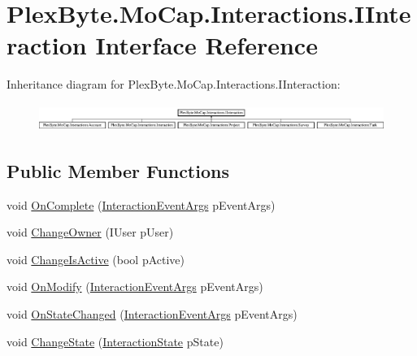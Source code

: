 \hypertarget{interface_plex_byte_1_1_mo_cap_1_1_interactions_1_1_i_interaction}{}\section{Plex\+Byte.\+Mo\+Cap.\+Interactions.\+I\+Interaction Interface Reference}
\label{interface_plex_byte_1_1_mo_cap_1_1_interactions_1_1_i_interaction}
Inheritance diagram for Plex\+Byte.\+Mo\+Cap.\+Interactions.\+I\+Interaction\+:\begin{figure}[H]
\begin{center}
\leavevmode
\includegraphics[height=0.899598cm]{interface_plex_byte_1_1_mo_cap_1_1_interactions_1_1_i_interaction}
\end{center}
\end{figure}
\subsection*{Public Member Functions}
\begin{DoxyCompactItemize}
\item 
void \hyperlink{interface_plex_byte_1_1_mo_cap_1_1_interactions_1_1_i_interaction_a9f32d6c1c2f2ae60dabb274f62128447}{On\+Complete} (\hyperlink{class_plex_byte_1_1_mo_cap_1_1_interactions_1_1_interaction_event_args}{Interaction\+Event\+Args} p\+Event\+Args)
\item 
void \hyperlink{interface_plex_byte_1_1_mo_cap_1_1_interactions_1_1_i_interaction_a7e3b0a67dc7d176877b8b94922a9bb52}{Change\+Owner} (I\+User p\+User)
\item 
void \hyperlink{interface_plex_byte_1_1_mo_cap_1_1_interactions_1_1_i_interaction_ac2d9f47a1139b931939e8cff07153aba}{Change\+Is\+Active} (bool p\+Active)
\item 
void \hyperlink{interface_plex_byte_1_1_mo_cap_1_1_interactions_1_1_i_interaction_af4fac42d753ae7f9652541542b8961c6}{On\+Modify} (\hyperlink{class_plex_byte_1_1_mo_cap_1_1_interactions_1_1_interaction_event_args}{Interaction\+Event\+Args} p\+Event\+Args)
\item 
void \hyperlink{interface_plex_byte_1_1_mo_cap_1_1_interactions_1_1_i_interaction_a5250247fb5f22a633e22d7f8dc946c4d}{On\+State\+Changed} (\hyperlink{class_plex_byte_1_1_mo_cap_1_1_interactions_1_1_interaction_event_args}{Interaction\+Event\+Args} p\+Event\+Args)
\item 
void \hyperlink{interface_plex_byte_1_1_mo_cap_1_1_interactions_1_1_i_interaction_a10beb35eb6061878469b5a6cd5431b32}{Change\+State} (\hyperlink{namespace_plex_byte_1_1_mo_cap_1_1_interactions_afcb673d9186608b6bd3b187179aedc8a}{Interaction\+State} p\+State)
\end{DoxyCompactItemize}
